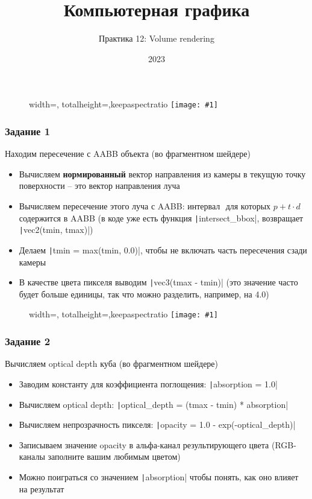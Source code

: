 \documentclass[10pt]{beamer}
\title{Компьютерная графика}
\subtitle{Практика 12: Volume rendering}
\date{2023}
\newcommand{\slideimage}[1]{
  \begin{figure}
    \begin{adjustbox}{width=\textwidth, totalheight=\textheight-2\baselineskip-2\baselineskip,keepaspectratio}
      \texttt{[image: \#1]}
    \end{adjustbox}
  \end{figure}
}
\begin{document}
\frame{\titlepage}

\begin{frame}[fragile]
\slideimage{0.png}
\end{frame}

\begin{frame}[fragile]
\frametitle{Задание 1}
Находим пересечение с AABB объекта (во фрагментном шейдере)
\begin{itemize}
\item Вычисляем \textbf{нормированный} вектор направления из камеры в текущую точку поверхности -- это вектор направления луча
\item Вычисляем пересечение этого луча с AABB: интервал \begin{math}[t_{min}, t_{max}]\end{math} для которых \begin{math}p + t \cdot d\end{math} содержится в AABB (в коде уже есть функция \texttt|intersect_bbox|, возвращает \texttt|vec2(tmin, tmax)|)
\item Делаем \texttt|tmin = max(tmin, 0.0)|, чтобы не включать часть пересечения сзади камеры
\item В качестве цвета пикселя выводим \texttt|vec3(tmax - tmin)| (это значение часто будет больше единицы, так что можно разделить, например, на 4.0)
\end{itemize}
\end{frame}

\begin{frame}[fragile]
\slideimage{1.png}
\end{frame}

\begin{frame}[fragile]
\frametitle{Задание 2}
Вычисляем optical depth куба (во фрагментном шейдере)
\begin{itemize}
\item Заводим константу для коэффициента поглощения: \texttt|absorption = 1.0|
\item Вычисляем optical depth: \texttt|optical_depth = (tmax - tmin) * absorption|
\item Вычисляем непрозрачность пикселя: \texttt|opacity = 1.0 - exp(-optical_depth)|
\item Записываем значение opacity в альфа-канал результирующего цвета (RGB-каналы заполните вашим любимым цветом)
\item Можно поиграться со значением \texttt|absorption| чтобы понять, как оно влияет на результат
\end{itemize}
\end{frame}
\end{document}
